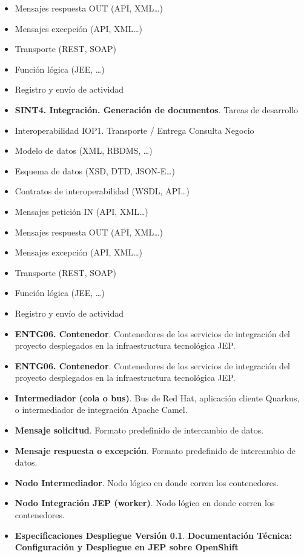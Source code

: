 \documentclass[
  paper=a4,
  ,captions=tableheading
]{scrartcl}
\begin{document}
\begin{itemize}
\item
  Mensajes respuesta OUT (API, XML\ldots)
\item
  Mensajes excepción (API, XML\ldots)
\item
  Transporte (REST, SOAP)
\item
  Función lógica (JEE, \ldots)
\item
  Registro y envío de actividad
\item
  \textbf{SINT4. Integración. Generación de documentos}. Tareas de
  desarrollo
\item
  Interoperabilidad IOP1. Transporte / Entrega Consulta Negocio
\item
  Modelo de datos (XML, RBDMS, \ldots)
\item
  Esquema de datos (XSD, DTD, JSON-E\ldots)
\item
  Contratos de interoperabilidad (WSDL, API\ldots)
\item
  Mensajes petición IN (API, XML\ldots)
\item
  Mensajes respuesta OUT (API, XML\ldots)
\item
  Mensajes excepción (API, XML\ldots)
\item
  Transporte (REST, SOAP)
\item
  Función lógica (JEE, \ldots)
\item
  Registro y envío de actividad
\item
  \textbf{ENTG06. Contenedor}. Contenedores de los servicios de
  integración del proyecto desplegados en la infraestructura tecnológica
  JEP.
\item
  \textbf{ENTG06. Contenedor}. Contenedores de los servicios de
  integración del proyecto desplegados en la infraestructura tecnológica
  JEP.
\item
  \textbf{Intermediador (cola o bus)}. Bus de Red Hat, aplicación
  cliente Quarkus, o intermediador de integración Apache Camel.
\item
  \textbf{Mensaje solicitud}. Formato predefinido de intercambio de
  datos.
\item
  \textbf{Mensaje respuesta o excepción}. Formato predefinido de
  intercambio de datos.
\item
  \textbf{Nodo Intermediador}. Nodo lógico en donde corren los
  contenedores.
\item
  \textbf{Nodo Integración JEP (worker)}. Nodo lógico en donde corren
  los contenedores.
\item
  \textbf{Especificaciones Despliegue Versión 0.1}.
  \textbf{Documentación Técnica: Configuración y Despliegue en JEP sobre
  OpenShift}
\end{itemize}
\end{document}
